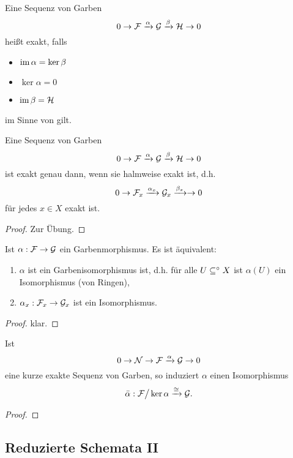 \begin{definition}
    Eine Sequenz von Garben
    \[0\to \mathcal{F} \xrightarrow\alpha \mathcal{G} \xrightarrow\beta \mathcal H \to 0\]
    heißt exakt, falls
    \begin{itemize}
        \item $\operatorname{im}\alpha = \ker\beta$
        \item $\ker\alpha = 0$
        \item $\operatorname{im}\beta = \mathcal H$         
    \end{itemize}
    im Sinne von  gilt.
\end{definition}

\begin{satz}
    \label{satz:garbensequenz exakt <=> halmweise exakt}
    Eine Sequenz von Garben
    \[0\to \mathcal{F} \xrightarrow\alpha \mathcal{G} \xrightarrow\beta \mathcal H \to 0\]
    ist exakt genau dann, wenn sie halmweise exakt ist, d.h.
    \[ 0 \to \mathcal{F}_x \xrightarrow{\alpha_x} \mathcal{G}_x \xrightarrow{\beta_x} \to 0\]
    für jedes $x\in X$ exakt ist.
\end{satz}
\begin{proof}
    Zur Übung.
\end{proof}

\begin{satz}
    \label{satz:garbeniso <=> halmweise iso}
    Ist $\alpha:\mathcal{F} \to \mathcal{G}$ ein Garbenmorphismus. Es ist äquivalent:
    \begin{enumerate}
    \item $\alpha$ ist ein Garbenisomorphismus ist, d.h.
    für alle $U\subseteq^\circ X$ ist $\alpha(U)$ ein Isomorphismus (von Ringen),
    \item $\alpha_x : \mathcal{F}_x \to \mathcal{G}_x$ ist ein Isomorphismus.
    \end{enumerate}   
\end{satz}
\begin{proof}
    klar.
\end{proof}

\begin{satz}
    \label{satz:homomophiesatz garben}
    Ist 
    \[0 \to \mathcal N \to \mathcal F \xrightarrow\alpha \mathcal{G} \to 0\]
    eine kurze exakte Sequenz von Garben,
    so induziert $\alpha$ einen Isomorphismus
    \[\bar\alpha: \mathcal{F}\big/\ker\alpha \xrightarrow\cong \mathcal{G}.\]
\end{satz}
\begin{proof}
\TODO
\end{proof}

\subsection{Reduzierte Schemata II}

